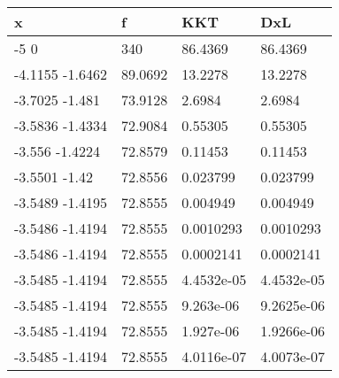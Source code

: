 \begin{tabular}{llll}
x & f & KKT & DxL \\ 
\hline 
-5  0 & 340 & 86.4369 & 86.4369 \\ 
-4.1155     -1.6462 & 89.0692 & 13.2278 & 13.2278 \\ 
-3.7025      -1.481 & 73.9128 & 2.6984 & 2.6984 \\ 
-3.5836     -1.4334 & 72.9084 & 0.55305 & 0.55305 \\ 
-3.556     -1.4224 & 72.8579 & 0.11453 & 0.11453 \\ 
-3.5501       -1.42 & 72.8556 & 0.023799 & 0.023799 \\ 
-3.5489     -1.4195 & 72.8555 & 0.004949 & 0.004949 \\ 
-3.5486     -1.4194 & 72.8555 & 0.0010293 & 0.0010293 \\ 
-3.5486     -1.4194 & 72.8555 & 0.0002141 & 0.0002141 \\ 
-3.5485     -1.4194 & 72.8555 & 4.4532e-05 & 4.4532e-05 \\ 
-3.5485     -1.4194 & 72.8555 & 9.263e-06 & 9.2625e-06 \\ 
-3.5485     -1.4194 & 72.8555 & 1.927e-06 & 1.9266e-06 \\ 
-3.5485     -1.4194 & 72.8555 & 4.0116e-07 & 4.0073e-07 \\ 
\hline 
\end{tabular}